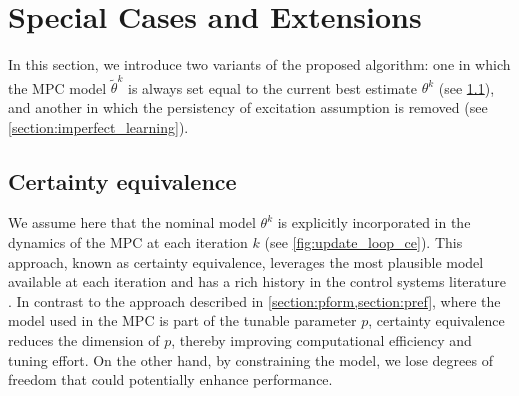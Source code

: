 \documentclass[journal,twoside,web,final]{ieeecolor}
\theoremstyle{definition}
\begin{document}
\section{Special Cases and Extensions}
In this section, we introduce two variants of the proposed algorithm: 
one in which the MPC model $\tilde{\theta}^k$ is always set equal to the current best estimate %
$\theta^k$ (see \cref{section:equivalence}), 
and another in which the persistency of excitation assumption is removed (see \cref{section:imperfect_learning}).

\subsection{Certainty equivalence}
\label{section:equivalence}
We assume here that the nominal model $\theta^k$ is explicitly incorporated in the dynamics of the MPC at each iteration $k$ (see \cref{fig:update_loop_ce}). 
This approach, known as certainty equivalence, leverages the most plausible model available at each iteration and has a rich history in the control systems literature \cite{bar2003dual}.
In contrast to the approach described in \cref{section:pform,section:pref}, where the model used in the MPC is part of the tunable parameter $p$, certainty equivalence reduces the dimension of $p$, thereby improving computational efficiency and tuning effort.
On the other hand, by constraining the model, we lose degrees of freedom that could potentially enhance performance.
\end{document}
